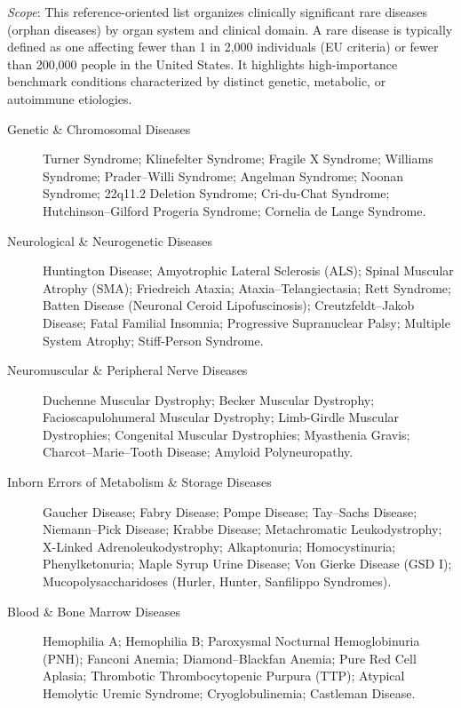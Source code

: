 \small
\noindent\textit{Scope}: This reference-oriented list organizes clinically significant rare diseases (orphan diseases) by organ system and clinical domain. A rare disease is typically defined as one affecting fewer than 1 in 2,000 individuals (EU criteria) or fewer than 200,000 people in the United States. It highlights high-importance benchmark conditions characterized by distinct genetic, metabolic, or autoimmune etiologies.

\medskip
\begin{description}
\item[Genetic \& Chromosomal Diseases] Turner Syndrome; Klinefelter Syndrome; Fragile X Syndrome; Williams Syndrome; Prader–Willi Syndrome; Angelman Syndrome; Noonan Syndrome; 22q11.2 Deletion Syndrome; Cri-du-Chat Syndrome; Hutchinson–Gilford Progeria Syndrome; Cornelia de Lange Syndrome.

\item[Neurological \& Neurogenetic Diseases] Huntington Disease; Amyotrophic Lateral Sclerosis (ALS); Spinal Muscular Atrophy (SMA); Friedreich Ataxia; Ataxia–Telangiectasia; Rett Syndrome; Batten Disease (Neuronal Ceroid Lipofuscinosis); Creutzfeldt–Jakob Disease; Fatal Familial Insomnia; Progressive Supranuclear Palsy; Multiple System Atrophy; Stiff-Person Syndrome.

\item[Neuromuscular \& Peripheral Nerve Diseases] Duchenne Muscular Dystrophy; Becker Muscular Dystrophy; Facioscapulohumeral Muscular Dystrophy; Limb-Girdle Muscular Dystrophies; Congenital Muscular Dystrophies; Myasthenia Gravis; Charcot–Marie–Tooth Disease; Amyloid Polyneuropathy.

\item[Inborn Errors of Metabolism \& Storage Diseases] Gaucher Disease; Fabry Disease; Pompe Disease; Tay–Sachs Disease; Niemann–Pick Disease; Krabbe Disease; Metachromatic Leukodystrophy; X-Linked Adrenoleukodystrophy; Alkaptonuria; Homocystinuria; Phenylketonuria; Maple Syrup Urine Disease; Von Gierke Disease (GSD I); Mucopolysaccharidoses (Hurler, Hunter, Sanfilippo Syndromes).

\item[Blood \& Bone Marrow Diseases] Hemophilia A; Hemophilia B; Paroxysmal Nocturnal Hemoglobinuria (PNH); Fanconi Anemia; Diamond–Blackfan Anemia; Pure Red Cell Aplasia; Thrombotic Thrombocytopenic Purpura (TTP); Atypical Hemolytic Uremic Syndrome; Cryoglobulinemia; Castleman Disease.


\end{description}
